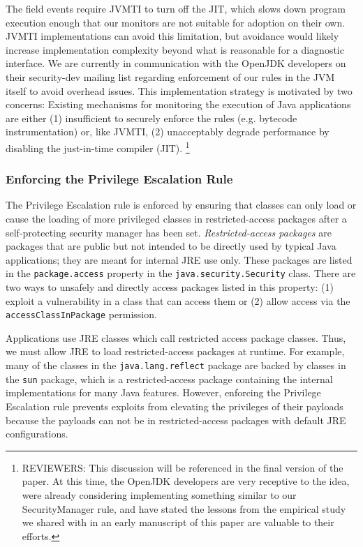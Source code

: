 \documentclass{sig-alternate}
\begin{document}
The field events require JVMTI to turn off the JIT, which slows down program
execution enough that our monitors are not suitable for adoption on their
own. JVMTI implementations can avoid this limitation, but avoidance would likely
increase implementation complexity beyond what is reasonable for a diagnostic
interface. We are currently in communication with the OpenJDK developers on
their security-dev mailing list regarding enforcement of our rules in the JVM
itself to avoid overhead issues. This implementation strategy is motivated by
two concerns: Existing mechanisms for monitoring the execution of Java
applications are either (1) insufficient to securely enforce the rules
(e.g. bytecode instrumentation) or, like JVMTI, (2) unacceptably degrade
performance by disabling the just-in-time compiler (JIT). 
\footnote{REVIEWERS: This discussion will be referenced in the final version of the paper. At this time, the OpenJDK developers are very receptive to the idea, were already considering implementing something similar to our SecurityManager rule, and have stated the lessons from the empirical study we shared with in an early manuscript of this paper are valuable to their efforts.}

\subsubsection{Enforcing the Privilege Escalation Rule}\label{sub:Enforcing-the-Privilege}

The Privilege Escalation rule is enforced by ensuring that classes
can only load or cause the loading of more privileged classes in restricted-access
packages after a self-protecting security manager has been set. \textit{Restricted-access
packages} are packages that are public but not intended to be directly
used by typical Java applications; they are meant for internal JRE
use only. These packages are listed in the \texttt{package.access}
property in the \texttt{java.security.Security} class. There are two
ways to unsafely and directly access packages listed in this property:
(1) exploit a vulnerability in a class that can access them or (2)
allow access via the \texttt{accessClassInPackage} permission.

Applications use JRE classes which call restricted access package
classes. Thus, we must allow JRE to load restricted-access packages
at runtime. For example, many of the classes in the \texttt{java.lang.reflect}
package are backed by classes in the \texttt{sun} package, which is
a restricted-access package containing the internal implementations
for many Java features. However, enforcing the Privilege Escalation
rule prevents exploits from elevating the privileges of their payloads
because the payloads can not be in restricted-access packages with
default JRE configurations. 
\end{document}
